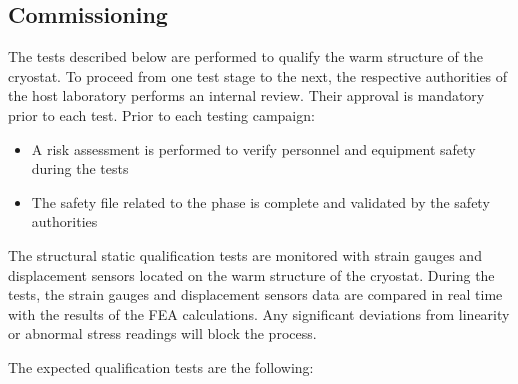 \subsection{Commissioning}
\label{sec:cryost-construc-commiss}

The tests described below are performed to qualify the warm structure of the cryostat. To proceed from one test stage to the next, the respective authorities of the host laboratory performs an internal review. Their approval is mandatory prior to each test. Prior to each testing campaign:

\begin{itemize}
\item A risk assessment is performed to verify personnel and equipment safety during the tests
\item The safety file related to the phase is complete and validated by the safety authorities
\end{itemize}

The structural static qualification tests are monitored with strain gauges and displacement sensors located on the warm structure of the cryostat. During the tests, the strain gauges and displacement sensors data are compared in real time with the results of the FEA calculations. Any significant deviations from linearity or abnormal stress readings will block the process.

The expected qualification tests are the following: 

